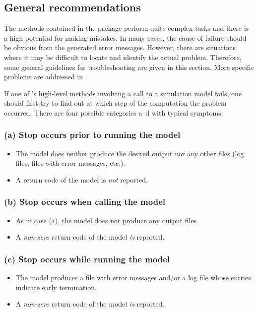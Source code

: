 \subsection{General recommendations} \label{sec:mops:troubleshooting:general}

The methods contained in the  package perform quite complex tasks and there is a high potential for making mistakes. In many cases, the cause of failure should be obvious from the generated error messages. However, there are situations where it may be difficult to locate and identify the actual problem. Therefore, some general guidelines for troubleshooting are given in this section. More specific problems are addressed in .

If one of 's high-level methods involving a call to a simulation model fails, one should first try to find out at which step of the computation the problem occurred. There are four possible categories a--d with typical symptoms:

\subsubsection*{(a) Stop occurs prior to running the model}
\begin{itemize}
  \item The model does neither produce the desired output nor any other files (log files, files with error messages, etc.).
  \item A return code of the model is \emph{not} reported.
\end{itemize}

\subsubsection*{(b) Stop occurs when calling the model}
\begin{itemize}
 \item As in case (a), the model does not produce any output files.
  \item A \emph{non-zero} return code of the model \emph{is} reported.
\end{itemize}

\subsubsection*{(c) Stop occurs while running the model}
\begin{itemize}
  \item The model produces a file with error messages and/or a log file whose entries indicate early termination.
  \item A \emph{non-zero} return code of the model \emph{is} reported.
\end{itemize}

